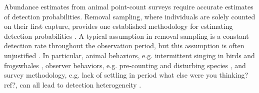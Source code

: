 \documentclass[useAMS,usenatbib,referee,12pt]{article}
\newcommand{\adam}[1]{{\color{blue} ADAM: #1}}
\newcommand{\jarad}[1]{{\color{Orange} #1}}
\begin{document}
Abundance estimates from animal point-count surveys require accurate estimates of detection probabilities.  
Removal sampling, where individuals are solely counted on their first capture, provides one established methodology for estimating detection probabilities \citep{Farnsworth2002}.
A typical assumption in removal sampling is a constant detection rate throughout the observation period, but this assumption is often unjustified \citep{Alldredge2007}. %
In particular, animal behaviors, e.g. intermittent singing in birds and frogswhales \citep{Scott2005, Diefenbach2007, Reidy2011}, observer behaviors, e.g. pre-counting and disturbing species \citep{McSheaRappole1997, Rosenstock2002, Alldredge2007, LeeMarsden2008, Johnson2008}, and survey methodology, e.g. lack of settling in period \jarad{what else were you thinking? ref?}, can all lead to detection heterogeneity \citep{Farnsworth2005}.
\end{document}
